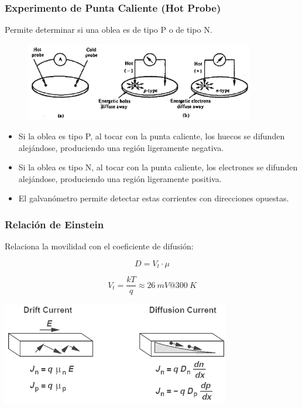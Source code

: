 \documentclass[10pt,t,aspectratio=169]{beamer}
\begin{document}
\begin{frame}[t]
    \frametitle{Experimento de Punta Caliente (Hot Probe)}

    Permite determinar si una oblea es de tipo P o de tipo N.

    \begin{figure}[H]
        \centering
        \includegraphics[width=10cm]{./figures/hotprobe.png}
    \end{figure}

    \begin{itemize}
        \item Si la oblea es tipo P, al tocar con la punta caliente, los huecos se difunden alejándose, produciendo una región ligeramente negativa.
        \item Si la oblea es tipo N, al tocar con la punta caliente, los electrones se difunden alejándose, produciendo una región ligeramente positiva.
        \item El galvanómetro permite detectar estas corrientes con direcciones opuestas.
    \end{itemize}
\end{frame}


\begin{frame}[t]
    \frametitle{Relación de Einstein}

    Relaciona la movilidad con el coeficiente de difusión:

    \[ D = V_t \cdot{} \mu \]

    \[ V_t = \dfrac{kT}{q} \approx 26\ mV @ 300\ K \]

    \centering
    \includegraphics[width=10cm]{./figures/driftanddiff.png}
\end{frame}
\end{document}
